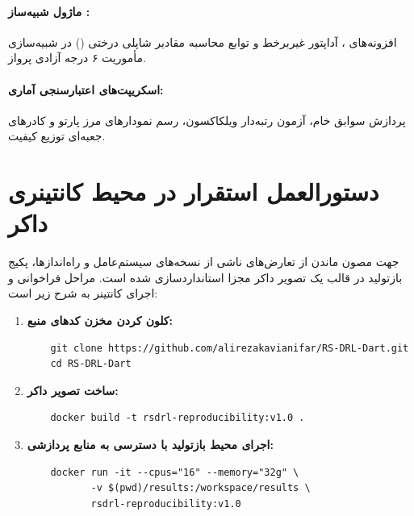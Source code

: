 \documentclass[oneside,openany,phd]{TMU-Thesis}
\begin{document}
\paragraph{ماژول شبیه‌ساز :}
افزونه‌های ، آداپتور غیربرخط  و توابع محاسبه مقادیر شاپلی درختی () در شبیه‌سازی مأموریت ۶ درجه آزادی پرواز.

\paragraph{اسکریپت‌های اعتبارسنجی آماری:}
پردازش سوابق خام، آزمون رتبه‌دار ویلکاکسون، رسم نمودارهای مرز پارتو و کادرهای جعبه‌ای توزیع کیفیت.

\section{دستورالعمل استقرار در محیط کانتینری داکر}
\label{sec:app_docker_setup}

جهت مصون ماندن از تعارض‌های ناشی از نسخه‌های سیستم‌عامل و راه‌اندازها، پکیج بازتولید در قالب یک تصویر داکر مجزا استانداردسازی شده است. مراحل فراخوانی و اجرای کانتینر به شرح زیر است:

\begin{enumerate}
    \item \textbf{کلون کردن مخزن کدهای منبع:}
    \begin{LTR}
    \small
    \begin{verbatim}
    git clone https://github.com/alirezakavianifar/RS-DRL-Dart.git
    cd RS-DRL-Dart
    \end{verbatim}
    \end{LTR}

    \item \textbf{ساخت تصویر داکر:}
    \begin{LTR}
    \small
    \begin{verbatim}
    docker build -t rsdrl-reproducibility:v1.0 .
    \end{verbatim}
    \end{LTR}

    \item \textbf{اجرای محیط بازتولید با دسترسی به منابع پردازشی:}
    \begin{LTR}
    \small
    \begin{verbatim}
    docker run -it --cpus="16" --memory="32g" \
           -v $(pwd)/results:/workspace/results \
           rsdrl-reproducibility:v1.0
    \end{verbatim}
    \end{LTR}
\end{enumerate}
\end{document}
